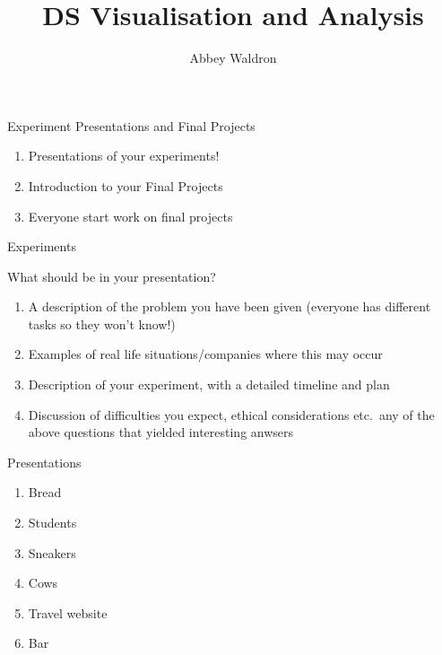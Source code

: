 \documentclass{beamer}
\newif\ifplacelogo
\begin{document}
\setlength{\unitlength}{1mm}
\title{DS Visualisation and Analysis}
\author[Abbey Waldron]{Abbey Waldron}
\date[October 16th, 2015]{}





{
\placelogofalse
\begin{frame}
  \titlepage
\end{frame}
}



\begin{frame}{Experiment Presentations and Final Projects}

\begin{enumerate}
\item Presentations of your experiments!
\item Introduction to your Final Projects
\item Everyone start work on final projects
\end{enumerate}

\end{frame}


\begin{frame}{Experiments}

\end{frame}

\begin{frame}{What should be in your presentation?}

\begin{enumerate}
\item A description of the problem you have been given (everyone has different tasks so they won't know!)
\item Examples of real life situations/companies where this may occur
\item Description of your experiment, with a detailed timeline and plan
\item Discussion of difficulties you expect, ethical considerations etc.~any of the above questions that yielded interesting anwsers
\end{enumerate}


\end{frame}


\begin{frame}{Presentations}

\begin{enumerate}
\item Bread
\item Students
\item Sneakers
\item Cows
\item Travel website
\item Bar
\end{enumerate}

\end{frame}
\end{document}
